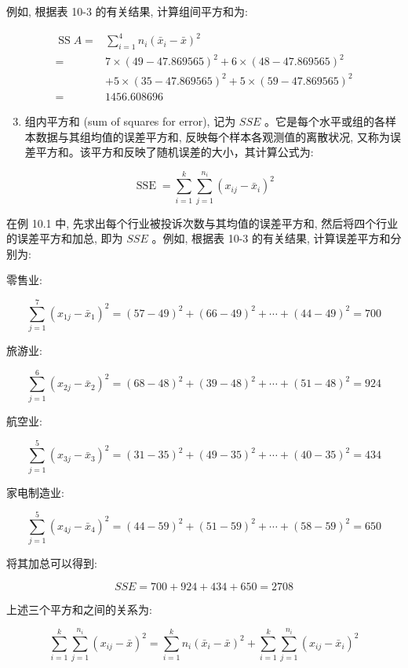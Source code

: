 \documentclass[10pt]{article}
\begin{document}
\begin{CJK*}{UTF8}{bsmi}
例如, 根据表 10-3 的有关结果, 计算组间平方和为:

$$
\begin{aligned}
\operatorname{SS} A= & \sum_{i=1}^{4} n_{i}\left(\bar{x}_{i}-\bar{x}\right)^{2} \\
= & 7 \times(49-47.869565)^{2}+6 \times(48-47.869565)^{2} \\
& +5 \times(35-47.869565)^{2}+5 \times(59-47.869565)^{2} \\
= & 1456.608696
\end{aligned}
$$

\begin{enumerate}
  \setcounter{enumi}{2}
  \item 组内平方和 (sum of squares for error), 记为 $S S E$ 。它是每个水平或组的各样本数据与其组均值的误差平方和, 反映每个样本各观测值的离散状况, 又称为误差平方和。该平方和反映了随机误差的大小，其计算公式为:
\end{enumerate}


\begin{equation*}
\operatorname{SSE}=\sum_{i=1}^{k} \sum_{j=1}^{n_{i}}\left(x_{i j}-\bar{x}_{i}\right)^{2} \tag{10.5}
\end{equation*}


在例 10.1 中, 先求出每个行业被投诉次数与其均值的误差平方和, 然后将四个行业的误差平方和加总, 即为 $S S E$ 。例如, 根据表 10-3 的有关结果, 计算误差平方和分别为:

零售业:

$$
\sum_{j=1}^{7}\left(x_{1 j}-\bar{x}_{1}\right)^{2}=(57-49)^{2}+(66-49)^{2}+\cdots+(44-49)^{2}=700
$$

旅游业:

$$
\sum_{j=1}^{6}\left(x_{2 j}-\bar{x}_{2}\right)^{2}=(68-48)^{2}+(39-48)^{2}+\cdots+(51-48)^{2}=924
$$

航空业:

$$
\sum_{j=1}^{5}\left(x_{3 j}-\bar{x}_{3}\right)^{2}=(31-35)^{2}+(49-35)^{2}+\cdots+(40-35)^{2}=434
$$

家电制造业:

$$
\sum_{j=1}^{5}\left(x_{4 j}-\bar{x}_{4}\right)^{2}=(44-59)^{2}+(51-59)^{2}+\cdots+(58-59)^{2}=650
$$

将其加总可以得到:

$$
S S E=700+924+434+650=2708
$$

上述三个平方和之间的关系为:


\begin{equation*}
\sum_{i=1}^{k} \sum_{j=1}^{n_{i}}\left(x_{i j}-\bar{x}\right)^{2}=\sum_{i=1}^{k} n_{i}\left(\bar{x}_{i}-\bar{x}\right)^{2}+\sum_{i=1}^{k} \sum_{j=1}^{n_{i}}\left(x_{i j}-\bar{x}_{i}\right)^{2} \tag{10.6}
\end{equation*}



\end{CJK*}
\end{document}
